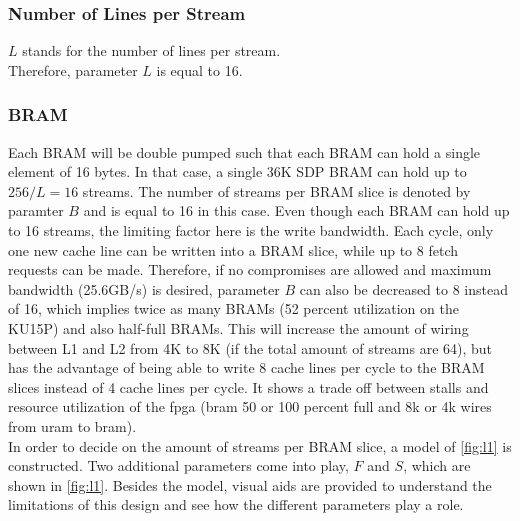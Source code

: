 \subsubsection{Number of Lines per Stream}
$L$ stands for the number of lines per stream.\\
Therefore, parameter $L$ is equal to 16.\\

\subsubsection{BRAM}
Each BRAM will be double pumped such that each BRAM can hold a single element of 16 bytes. In that case, a single 36K SDP BRAM can hold up to $256/L=16$ streams. The number of streams per BRAM slice is denoted by paramter $B$ and is equal to 16 in this case. Even though each BRAM can hold up to 16 streams, the limiting factor here is the write bandwidth. Each cycle, only one new cache line can be written into a BRAM slice, while up to 8 fetch requests can be made. Therefore, if no compromises are allowed and maximum bandwidth (25.6GB/s) is desired, parameter $B$ can also be decreased to 8 instead of 16, which implies twice as many BRAMs (52 percent utilization on the KU15P) and also half-full BRAMs. This will increase the amount of wiring between L1 and L2 from 4K to 8K (if the total amount of streams are 64), but has the advantage of being able to write 8 cache lines per cycle to the BRAM slices instead of 4 cache lines per cycle. It shows a trade off between stalls and resource utilization of the fpga (bram 50 or 100 percent full and 8k or 4k wires from uram to bram).\\
In order to decide on the amount of streams per BRAM slice, a model of \autoref{fig:l1} is constructed. Two additional parameters come into play, $F$ and $S$, which are shown in \autoref{fig:l1}. Besides the model, visual aids are provided to understand the limitations of this design and see how the different parameters play a role.\\

